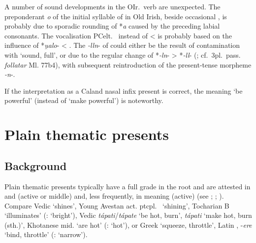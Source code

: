 \documentclass[output=paper,colorlinks,citecolor=brown]{langscibook}
\begin{document}
A number of sound developments in the OIr.\  verb are unexpected. The preponderant \textit{o} of the initial syllable of  in Old Irish, beside occasional , is probably due to sporadic rounding of *\textit{a} caused by the preceding labial consonants. The vocalisation PCelt.\  instead of  <  is probably based on the influence of *\textit{u̯alo}-  < . The \textit{-lln}- of  could either be the result of contamination with  ‘sound, full’, or due to the regular change of *\textit{-ln}- > *\textit{-ll}- (\citealt[Section 2.1]{Stifter2024}; cf.\ 3pl.\ pass. \textit{follatar}  Ml. 77b4), with subsequent reintroduction of the present-tense morpheme \textit{-n}-. 

If the interpretation as a  Caland nasal infix present  is correct, the  meaning ‘be powerful’ (instead of  ‘make powerful’) is noteworthy.

\section{Plain thematic presents} 
\label{sec:CelticSTP}

\subsection{Background}

Plain thematic presents  typically have a full grade in the root and are attested in  and  (active or middle) and, less frequently, in  meaning (active) (see \citealt[146--157]{Rau2009}; \citealt[258--265]{Rau2013}; \citealt{VillanuevaSvensson2021}). Compare Vedic  ‘shines’, Young Avestan act. ptcpl.\   ‘shining’, Tocharian B  ‘illuminates’ (:  ‘bright’), Vedic   \textit{tápati}/\textit{tápate} ‘be hot, burn’, \textit{tápati} ‘make hot, burn (sth.)’, Khotanese mid.  ‘are hot’ (:  ‘hot’), or Greek  ‘squeeze, throttle’, Latin , -\textit{ere} ‘bind, throttle’ (:  ‘narrow’).
\end{document}
